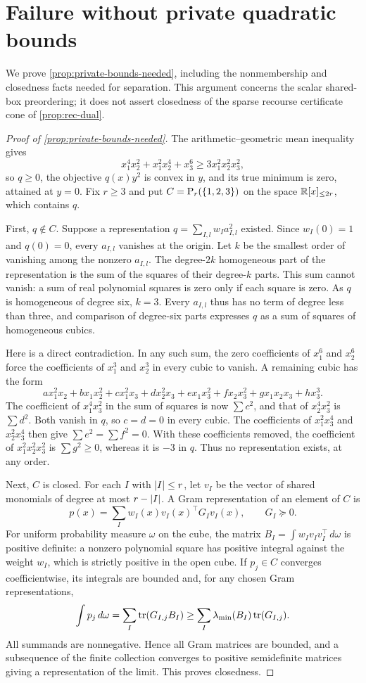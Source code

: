 \section{Failure without private quadratic bounds}
\label{sec:app-rec-bounds}

We prove \cref{prop:private-bounds-needed}, including the nonmembership
and closedness facts needed for separation. This argument concerns the
scalar shared-box preordering; it does not assert closedness of the sparse
recourse certificate cone of \cref{prop:rec-dual}.

\begin{proof}[Proof of \cref{prop:private-bounds-needed}]
The arithmetic--geometric mean inequality gives
\[
  x_1^4x_2^2+x_1^2x_2^4+x_3^6
  \ge3x_1^2x_2^2x_3^2,
\]
so $q\ge0$, the objective $q(x)y^2$ is convex in $y$, and its true
minimum is zero, attained at $y=0$. Fix $r\ge3$ and put
$C=\mathrm{P}_r(\{1,2,3\})$ on the space $\mathbb{R}[x]_{\le 2r}$, which contains $q$.

First, $q\notin C$. Suppose a representation
$q=\sum_{I,l}w_Ia_{I,l}^2$ existed. Since $w_I(0)=1$ and $q(0)=0$,
every $a_{I,l}$ vanishes at the origin. Let $k$ be the smallest order of
vanishing among the nonzero $a_{I,l}$. The degree-$2k$ homogeneous part
of the representation is the sum of the squares of their degree-$k$
parts. This sum cannot vanish: a sum of real polynomial squares is zero
only if each square is zero. As $q$ is homogeneous of degree six, $k=3$.
Every $a_{I,l}$ thus has no term of degree less than three, and comparison
of degree-six parts expresses $q$ as a sum of squares of homogeneous
cubics.

Here is a direct contradiction. In any such sum, the zero coefficients
of $x_1^6$ and $x_2^6$ force the coefficients of $x_1^3$ and $x_2^3$
in every cubic to vanish. A remaining cubic has the form
\[
 a x_1^2x_2+b x_1x_2^2+c x_1^2x_3+d x_2^2x_3
 +e x_1x_3^2+f x_2x_3^2+g x_1x_2x_3+h x_3^3.
\]
The coefficient of $x_1^4x_3^2$ in the sum of squares is now $\sum c^2$,
and that of $x_2^4x_3^2$ is $\sum d^2$. Both vanish in $q$, so $c=d=0$
in every cubic. The coefficients of $x_1^2x_3^4$ and $x_2^2x_3^4$ then
give $\sum e^2=\sum f^2=0$. With these coefficients removed, the
coefficient of $x_1^2x_2^2x_3^2$ is $\sum g^2\ge0$, whereas it is $-3$
in $q$. Thus no representation exists, at any order.

Next, $C$ is closed. For each $I$ with $\lvert I\rvert\le r$, let $v_I$ be the
vector of shared monomials of degree at most $r-\lvert I\rvert$. A Gram
representation of an element of $C$ is
\[
 p(x)=\sum_Iw_I(x)v_I(x)^\top G_Iv_I(x),\qquad G_I\succeq0.
\]
For uniform probability measure $\omega$ on the cube, the matrix
$B_I=\int w_Iv_Iv_I^\top\,d\omega$ is positive definite: a nonzero
polynomial square has positive integral against the weight $w_I$, which
is strictly positive in the open cube. If $p_j\in C$ converges
coefficientwise, its integrals are bounded and, for any chosen Gram
representations,
\[
 \int p_j\,d\omega=\sum_I\operatorname{tr}(G_{I,j}B_I)
 \ge\sum_I\lambda_{\min}(B_I)\operatorname{tr}(G_{I,j}).
\]
All summands are nonnegative. Hence all Gram matrices are bounded, and a
subsequence of the finite collection converges to positive semidefinite
matrices giving a representation of the limit. This proves closedness.


\end{proof}
